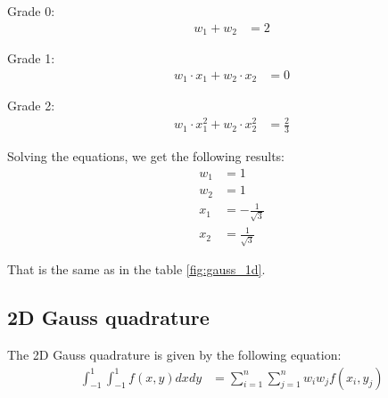 \documentclass{article}  %
\begin{document}
Grade 0:
\begin{align}
  w_1 +w_2 &= 2 
\end{align}

Grade 1:
\begin{align}
  w_1 \cdot x_1 + w_2 \cdot x_2 &= 0 
\end{align}

Grade 2:
\begin{align}
  w_1 \cdot x_1^2 + w_2 \cdot x_2^2 &= \frac{2}{3} 
\end{align}

Solving the equations, we get the following results:  
\begin{align}
  w_1 &= 1 \\
  w_2 &= 1 \\
  x_1 &= -\frac{1}{\sqrt{3}} \\
  x_2 &= \frac{1}{\sqrt{3}}
\end{align}

That is the same as in the table \ref{fig:gauss_1d}.
\subsection{2D Gauss quadrature}
The 2D Gauss quadrature is given by the following equation:
\begin{align}
  \int_{-1}^{1}\int_{-1}^{1} f(x,y) dx dy & = \sum_{i=1}^{n} \sum_{j=1}^{n} w_i w_j f(x_i,y_j) \\
\end{align}
\end{document}

